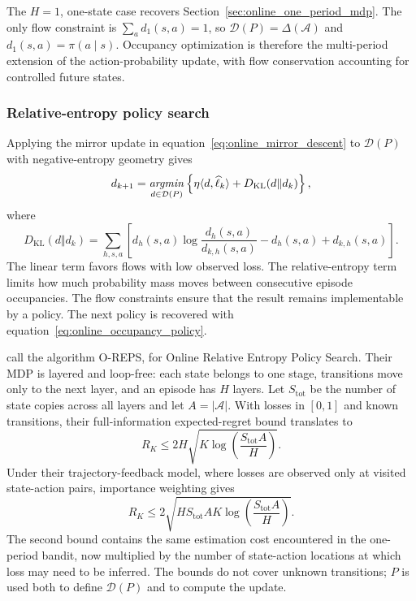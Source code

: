 The $H=1$, one-state case recovers Section~\ref{sec:online_one_period_mdp}. The only flow constraint is $\sum_a d_1(s,a)=1$, so $\mathcal D(P)=\Delta(\mathcal A)$ and $d_1(s,a)=\pi(a\mid s)$. Occupancy optimization is therefore the multi-period extension of the action-probability update, with flow conservation accounting for controlled future states.

\subsubsection{Relative-entropy policy search}
\label{sec:online_oreps}

Applying the mirror update in equation~\eqref{eq:online_mirror_descent} to $\mathcal D(P)$ with negative-entropy geometry gives
\begin{equation}
d_{k+1}
=
\mathop{\it argmin}_{d\in\mathcal D(P)}
\left\{
\eta\langle d,\widehat\ell_k\rangle
+
D_{\mathrm{KL}}(d\Vert d_k)
\right\},
\label{eq:online_oreps_update}
\end{equation}
where
\begin{equation}
D_{\mathrm{KL}}(d\Vert d_k)
=
\sum_{h,s,a}
\left[
d_h(s,a)\log\frac{d_h(s,a)}{d_{k,h}(s,a)}
-d_h(s,a)+d_{k,h}(s,a)
\right].
\label{eq:online_flow_kl}
\end{equation}
The linear term favors flows with low observed loss. The relative-entropy term limits how much probability mass moves between consecutive episode occupancies. The flow constraints ensure that the result remains implementable by a policy. The next policy is recovered with equation~\eqref{eq:online_occupancy_policy}.

\citet{ziminNeu2013} call the algorithm O-REPS, for Online Relative Entropy Policy Search. Their MDP is layered and loop-free: each state belongs to one stage, transitions move only to the next layer, and an episode has $H$ layers. Let $S_{\mathrm{tot}}$ be the number of state copies across all layers and let $A=|\mathcal A|$. With losses in $[0,1]$ and known transitions, their full-information expected-regret bound translates to
\begin{equation}
R_K
\leq
2H
\sqrt{
K\log\!\left(\frac{S_{\mathrm{tot}}A}{H}\right)
}.
\label{eq:online_oreps_full_bound}
\end{equation}
Under their trajectory-feedback model, where losses are observed only at visited state-action pairs, importance weighting gives
\begin{equation}
R_K
\leq
2
\sqrt{
HS_{\mathrm{tot}}AK
\log\!\left(\frac{S_{\mathrm{tot}}A}{H}\right)
}.
\label{eq:online_oreps_bandit_bound}
\end{equation}
The second bound contains the same estimation cost encountered in the one-period bandit, now multiplied by the number of state-action locations at which loss may need to be inferred. The bounds do not cover unknown transitions; $P$ is used both to define $\mathcal D(P)$ and to compute the update.

